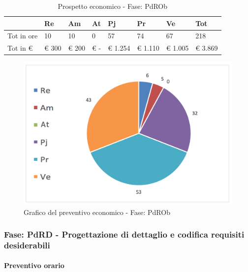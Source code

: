 							\begin{table}[H] \begin{center} \begin{tabular}{llllllll}
							\toprule
								&	\textbf{Re}	&	\textbf{Am}	&	\textbf{At}	&	\textbf{Pj}	&	\textbf{Pr}	&	\textbf{Ve}	&	\textbf{Tot}\\

							\midrule
							Tot in ore	&	10	&	10	&	0	&	57	&	74	&	67	&	218	 \\


							Tot in €	&	 €           300 	 & 	 €        200 	 & 	 €               -   	 & 	 €    1.254 	 & 	 €        1.110 	 & 	 €    1.005 	 & 	 €              3.869 	 \\
							\bottomrule
							\end{tabular} \end{center} \caption{Prospetto economico - Fase:
							PdROb
							}\label{tab:s_PdROb} \end{table}		\begin{figure}[H]  \centering  \includegraphics[scale=0.40]{img/s_PdROb}
									\caption{Grafico del preventivo economico - Fase: 								PdROb	}  \label{fig:s_PdROb} \end{figure}

		\newpage
		\subsubsection {Fase: PdRD - Progettazione di dettaglio e codifica requisiti desiderabili}
		\paragraph{Preventivo orario}

